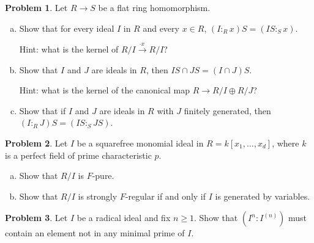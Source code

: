 \documentclass[11pt]{article}
\theoremstyle{definition}
\newtheorem{problem}{Problem}
\begin{document}
\begin{problem}
	Let $R \to S$ be a flat ring homomorphism.
	\begin{enumerate}[a)]
		\item Show that for every ideal $I$ in $R$ and every $x \in R$, $(I :_R x) S = (IS :_S x)$. 
		
	Hint: what is the kernel of $R/I \xrightarrow{\cdot x \, } R/I$?
		
		\item Show that $I$ and $J$ are ideals in $R$, then $IS \cap JS = (I \cap J)S$.
		
	Hint: what is the kernel of the canonical map $R \to R/I \oplus R/J$?	
		
		\item Show that if $I$ and $J$ are ideals in $R$ with $J$ finitely generated, then $(I :_R J)S = (IS :_S JS)$.
		
	\end{enumerate}
\end{problem}


\begin{problem}
	Let $I$ be a squarefree monomial ideal in $R = k[x_1, \ldots, x_d]$, where $k$ is a perfect field of prime characteristic $p$.
	\begin{enumerate}[a)]
		\item Show that $R/I$ is $F$-pure.
		\item Show that $R/I$ is strongly $F$-regular if and only if $I$ is generated by variables.
	\end{enumerate}
\end{problem}



\begin{problem}
	Let $I$ be a radical ideal and fix $n \geqslant 1$. Show that $(I^n : I^{(n)})$ must contain an element not in any minimal prime of $I$.
\end{problem}
\end{document}
